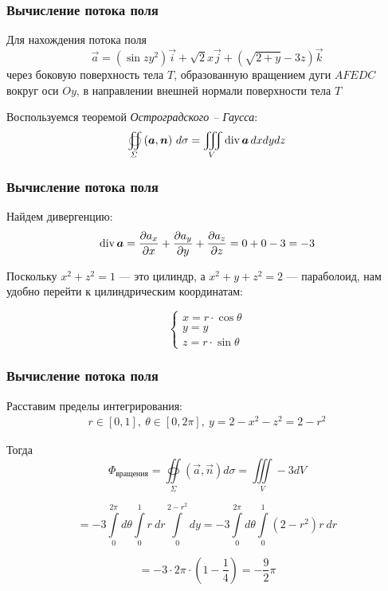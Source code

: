 \begin{frame}\frametitle{Вычисление потока поля}
	Для нахождения потока поля
	\begin{equation*}
		\vec a = (\sin zy^2) \vec i + \sqrt{2} x \vec j + (\sqrt{2+y} -3z) \vec k
	\end{equation*}
  через боковую поверхность тела \(T\), образованную вращением дуги \(AFEDC\)
	вокруг оси \(Oy\), в направлении внешней нормали поверхности тела \(T\)

	Воспользуемся теоремой \textit{Остроградского -- Гаусса}:
	\begin{equation*}
		\oiint\limits_{\Sigma}\left( \vec {a}, \vec {n} \right) \, d\sigma = \iiint\limits_V \Div \vec {a} \, dxdydz
	\end{equation*}
\end{frame}

\begin{frame}\frametitle{Вычисление потока поля}
	Найдем дивергенцию:
	\begin{equation*}
		\Div \vec a = \frac{\partial a_x}{\partial x} +  \frac{\partial a_y}{\partial y} +  \frac{\partial a_z}{\partial z} = 0 + 0 - 3 = -3
	\end{equation*}

	Поскольку $x^2 + z^2 = 1$ — это цилиндр, а $x^2 + y + z^2 = 2$ — параболоид, нам удобно перейти к цилиндрическим координатам:

	\begin{equation*}
		\begin{cases}
			x = r \cdot \cos \theta \\
			y = y                    \\
			z = r \cdot \sin \theta
		\end{cases}
	\end{equation*}

\end{frame}

\begin{frame}\frametitle{Вычисление потока поля} 
  Расставим пределы интегрирования:
  \begin{align*}
    r \in [0, 1], \
    \theta \in [0, 2\pi], \ 
    y = 2 - x^2 - z^2 = 2 - r^2
  \end{align*}

  Тогда
  \begin{equation*}
    \Phi_{\text{вращения}} = \oiint\limits_{\Sigma}\left( \vec {a}, \vec {n} \right) d\sigma = \iiint\limits_V -3 dV
  \end{equation*}
  
  \begin{equation*}
    = -3 \int\limits_{0}^{2 \pi} d \theta
    \int\limits_{0}^{1} r~dr 
    \int\limits_{0}^{2-r^2} dy 
    = -3 \int\limits_{0}^{2 \pi} d \theta
    \int\limits_{0}^{1} (2-r^2)r~dr 
  \end{equation*}
 
  \begin{equation*}
    = -3 \cdot 2 \pi \cdot
    (1 - \frac{1}{4})
    = - \frac{9}{2}\pi
  \end{equation*}

\end{frame}

